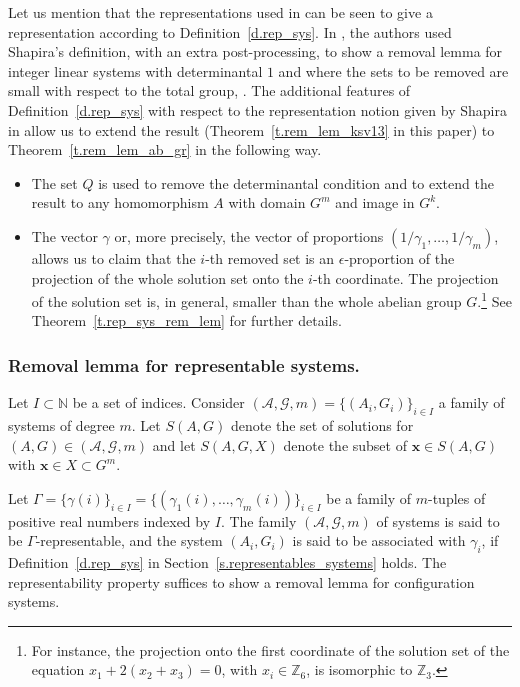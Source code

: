 \documentclass[10pt]{article}
\newcommand{\Z}{\mathbb Z}
\begin{document}
Let us mention that the representations used in \cite{kraserven09,kraserven12,ksv13,sha10} can be seen to give a representation according to Definition~\ref{d.rep_sys}. In \cite{ksv13}, the authors used Shapira's definition, with an extra post-processing, to show a removal lemma for integer linear systems with determinantal $1$ and where the sets to be removed are small with respect to the total group, \cite[Theorem~1]{ksv13}.
The additional features of Definition~\ref{d.rep_sys} with respect to the representation notion given by Shapira in \cite{sha10}
 allow us to extend the result \cite[Theorem~1]{ksv13} (Theorem~\ref{t.rem_lem_ksv13} in this paper) to Theorem~\ref{t.rem_lem_ab_gr} in the following way. 
\begin{itemize}
	\item The set $Q$ is used to remove the determinantal condition and to extend the result to any homomorphism $A$ with domain $G^m$ and image in $G^k$.
	\item The vector $\gamma$ or, more precisely, the vector of proportions $(1/\gamma_1, \ldots, 1/\gamma_m)$, allows us to claim that the $i$-th removed set is an $\epsilon$-proportion of the projection of the whole solution set onto the $i$-th coordinate. The projection of the solution set is, in general, smaller than the whole abelian group $G$.\footnote{\label{f.footnote_7}For instance, the projection onto the first coordinate of the solution set of the equation $x_1+2(x_2+x_3)=0$, with $x_i\in \Z_6$, is isomorphic to $\Z_3$.} See Theorem~\ref{t.rep_sys_rem_lem} for further details.
\end{itemize}






\subsubsection{Removal lemma for representable systems.}



Let $I\subset \mathbb{N}$ be a set of indices. Consider $(\mathcal{A},\mathcal{G},m)=\{(A_i,G_i)\}_{i\in I}$ a family of systems of degree $m$. 
Let $S(A,G)$ denote the set of solutions for $(A,G)\in (\mathcal{A},\mathcal{G},m)$ and let $S(A,G,X)$ denote the subset of $\mathbf{x}\in S(A,G)$ with $\mathbf{x}\in X\subset G^m$.

Let $\Gamma=\{\gamma(i)\}_{i\in I}=\{(\gamma_1(i),\ldots,\gamma_m(i))\}_{i\in I}$ be a family of $m$-tuples of positive real numbers indexed by $I$. 
The family $(\mathcal{A},\mathcal{G},m)$ of systems is said to be $\Gamma$-representable, and the system $(A_i,G_i)$ is said to be associated with $\gamma_i$, if Definition~\ref{d.rep_sys} in Section~\ref{s.representables_systems} holds. The representability property suffices to show a removal lemma for configuration systems.
\end{document}
